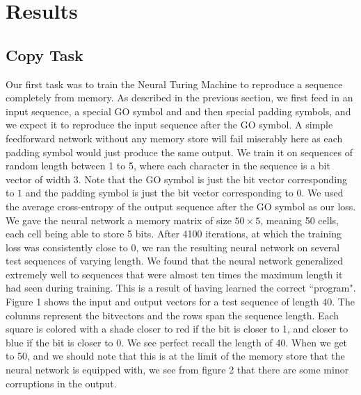 \documentclass[12pt]{article}
\begin{document}
\section{Results}\label{results}

\subsection{Copy Task}

Our first task was to train the Neural Turing Machine to reproduce a sequence
completely from memory. As described in the previous section, we first feed in
an input sequence, a special GO symbol and and then special padding symbols,
and we expect it to reproduce the input sequence after the GO symbol.
A simple feedforward network without any memory store will fail miserably
here as each padding symbol would just produce the same output.
We train it on sequences of random length between 1 to 5, where each character
in the sequence is a bit vector of width 3. Note that the GO symbol is just the
bit vector corresponding to $1$ and the padding symbol is just the bit vector
corresponding to $0$. We used the average cross-entropy
of the output sequence after the GO symbol as our loss. We gave the neural
network a memory matrix of size $50 \times 5$, meaning 50 cells, each cell being
able to store 5 bits. After 4100 iterations, at which the training loss was
consistently close to 0, we ran the resulting neural network on several test
sequences of varying length. We found that the neural network generalized
extremely well to sequences that were almost ten times the maximum length
it had seen during training. This is a result of having learned the correct
``program". Figure 1 shows the input and output vectors for a test sequence
of length $40$. The columns represent the bitvectors and the rows span
the sequence length. Each square is colored with a shade closer to red if the
bit is closer to 1, and closer to blue if the bit is closer to 0.
We see perfect recall the length of 40. When we get to 50, and we should
note that this is at the limit of the memory store that the neural network
is equipped with, we see from figure 2 that there are some minor corruptions
in the output.
\end{document}
